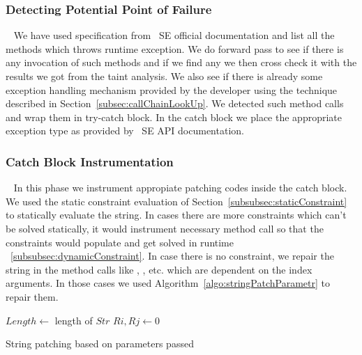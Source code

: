 \subsubsection{Detecting Potential Point of Failure}
\label{subsub:detectingFailure}
~\newline
We have used specification from \java\ SE official documentation and list all
the methods which throws runtime exception. We do forward pass to see if there 
is any invocation of such methods and if we find any we then cross check it 
with the results we got from the taint analysis. We also see if there is already
some exception handling mechanism provided by the developer using the technique 
described in Section~\ref{subsec:callChainLookUp}. We detected such method calls
and wrap them in try-catch block. In the catch block we place the appropriate
exception type as provided by \java\ SE API documentation. 

\subsubsection{Catch Block Instrumentation}
\label{subsub:catchInstrumentation}
~\newline
In this phase we instrument appropiate patching codes inside the catch block.
We used the static constraint evaluation of
Section~\ref{subsubsec:staticConstraint} to statically evaluate the string. In
cases there are more constraints which can't be solved statically, it would instrument
necessary method call so that the constraints would populate and get solved in runtime
~\ref{subsubsec:dynamicConstraint}. In case there is no constraint, we repair the
string in the method calls like , ,  etc.
which are dependent on the index arguments. In those cases we used
Algorithm~\ref{algo:stringPatchParametr} to repair them.


\begin{algorithm}
\scriptsize
\DontPrintSemicolon
{}
\Begin
{
	$Length \longleftarrow$ length of $Str$\;
	 {
		$Ri, Rj \longleftarrow 0$\;
	} 	
}
\caption{String patching based on parameters passed}
\label{algo:stringPatchParametr}
\end{algorithm}


